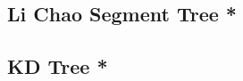 \documentclass[a4paper,10pt,twocolumn,oneside]{article}
\begin{document}
% 

% 

% 

%

% 

\subsection{Li Chao Segment Tree *}


% 

\subsection{KD Tree *}

% 

%
\end{document}
